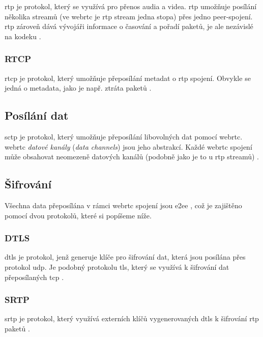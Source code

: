 \gls{rtp} je protokol, který se využívá pro přenos audia a videa. \gls{rtp}
umožňuje posílání několika streamů (ve \gls{webrtc} je \gls{rtp} stream jedna
stopa) přes jedno peer-spojení. \gls{rtp} zároveň dává vývojáři informace o
časování a pořadí paketů, je ale nezávislé na kodeku
\parencite{WebRTCForTheCurious}.

\subsubsection{RTCP}\label{rtcp}

\gls{rtcp} je protokol, který umožňuje přeposílání metadat o \gls{rtp} spojení.
Obvykle se jedná o metadata, jako je např. ztráta paketů
\parencite{WebRTCForTheCurious}.

\subsection{Posílání dat}\label{sctp}

\gls{sctp} je protokol, který umožňuje přeposílání libovolných dat pomocí
\gls{webrtc}. \gls{webrtc} \textit{datové kanály} (\textit{data channels}) jsou
jeho abstrakcí. Každé \gls{webrtc} spojení může obsahovat neomezeně datových
kanálů (podobně jako je to u \gls{rtp} streamů) \parencite{WebRTCForTheCurious}.

\subsection{Šifrování}

Všechna data přeposílána v rámci \gls{webrtc} spojení jsou \gls{e2ee}
\parencite{WebRTCForTheCurious}, což je zajištěno pomocí dvou protokolů, které
si popíšeme níže.

\subsubsection{DTLS}\label{dtls}

\gls{dtls} je protokol, jenž generuje klíče pro šifrování dat, která jsou
posílána přes protokol \gls{udp}. Je podobný protokolu \gls{tls}, který se
využívá k šifrování dat přeposílaných \gls{tcp} \parencite{WebRTCForTheCurious}.

\subsubsection{SRTP}\label{srtp}

\gls{srtp} je protokol, který využívá externích klíčů vygenerovaných \gls{dtls}
k šifrování \gls{rtp} paketů \parencite{WebRTCForTheCurious}.

